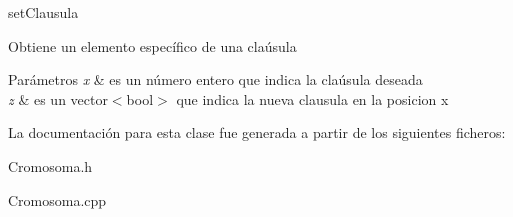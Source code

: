 set\-Clausula 

Obtiene un elemento específico de una claúsula 
\begin{DoxyParams}{Parámetros}
{\em x} & es un número entero que indica la claúsula deseada \\
\hline
{\em z} & es un vector$<$bool$>$ que indica la nueva clausula en la posicion x \\
\hline
\end{DoxyParams}


La documentación para esta clase fue generada a partir de los siguientes ficheros\-:\begin{DoxyCompactItemize}
\item 
Cromosoma.\-h\item 
Cromosoma.\-cpp\end{DoxyCompactItemize}
